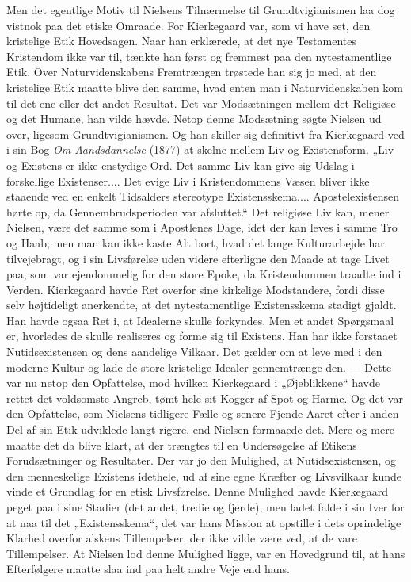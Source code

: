 \documentclass[12pt,a4paper,openany]{book}
\newcommand{\opage}[1]{\marginnote{\footnotesize\textit{[#1]}}}
\begin{document}
Men det egentlige Motiv til Nielsens Tilnærmelse til Grundtvigianismen laa dog
vistnok paa det etiske Omraade. For Kierkegaard var, som vi have set, den
kristelige Etik Hovedsagen. Naar han erklærede, at det nye Testamentes
Kristendom ikke var til, tænkte han først og fremmest paa den nytestamentlige
Etik. Over Naturvidenskabens Fremtrængen trøstede han sig jo med, at den
kristelige Etik maatte blive den samme, hvad enten man i Naturvidenskaben kom
til det ene eller det andet Resultat. Det var Modsætningen mellem det Religiøse
og det Humane, han vilde hævde. Netop denne Modsætning søgte Nielsen ud over,
ligesom Grundtvigianismen. Og han skiller sig definitivt fra Kierkegaard ved i
sin Bog \textit{Om Aandsdannelse} (1877) at skelne mellem Liv og
\setcounter{footnote}{0}%
\opage{195}Existensform. „Liv og Existens er ikke enstydige Ord. Det samme Liv
kan give sig Udslag i forskellige Existenser.... Det evige Liv i Kristendommens
Væsen bliver ikke staaende ved en enkelt Tidsalders stereotype
Existensskema.... Apostelexistensen hørte op, da Gennembrudsperioden var
afsluttet.“ Det religiøse Liv kan, mener Nielsen, være det samme som i
Apostlenes Dage, idet der kan leves i samme Tro og Haab; men man kan ikke kaste
Alt bort, hvad det lange Kulturarbejde har tilvejebragt, og i sin Livsførelse
uden videre efterligne den Maade at tage Livet paa, som var ejendommelig for
den store Epoke, da Kristendommen traadte ind i Verden. Kierkegaard havde Ret
overfor sine kirkelige Modstandere, fordi disse selv højtideligt anerkendte, at
det nytestamentlige Existensskema stadigt gjaldt. Han havde ogsaa Ret i, at
Idealerne skulle forkyndes. Men et andet Spørgsmaal er, hvorledes de skulle
realiseres og forme sig til Existens. Han har ikke forstaaet Nutidsexistensen
og dens aandelige Vilkaar. Det gælder om at leve med i den moderne Kultur og
lade de store kristelige Idealer gennemtrænge den. --- Dette var nu netop den
Opfattelse, mod hvilken Kierkegaard i „Øjeblikkene“ havde rettet det voldsomste
Angreb, tømt hele sit Kogger af Spot og Harme. Og det var den Opfattelse, som
Nielsens tidligere Fælle og senere Fjende Aaret efter i anden Del af sin Etik
udviklede langt rigere, end Nielsen formaaede det. Mere og mere maatte det da
blive klart, at der trængtes til en Undersøgelse af Etikens Forudsætninger og
Resultater. Der var jo den Mulighed, at Nutidsexistensen, og den menneskelige
Existens idethele, ud af sine egne Kræfter og Livsvilkaar kunde vinde et
Grundlag for en etisk Livsførelse. Denne Mulighed havde Kierkegaard peget paa i
sine Stadier (det andet, tredie og fjerde), men ladet falde i sin Iver for at
naa til det „Existensskema“, det var hans Mission at opstille i dets
oprindelige Klarhed overfor alskens Tillempelser, der ikke vilde være ved, at
de vare Tillempelser. At Nielsen lod denne Mulighed ligge, var en Hovedgrund
til, at hans Efterfølgere maatte slaa ind paa helt andre Veje end hans.
\end{document}
